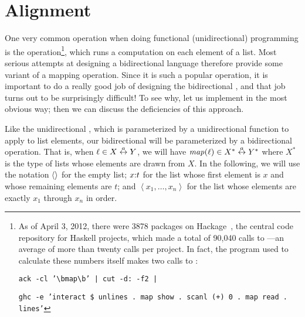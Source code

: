 \section{Alignment}
One very common operation when doing functional (unidirectional) programming
is the \map operation\footnote{As of April 3, 2012, there were 3878 packages
on Hackage~\cite{Hackage2012}, the central code repository for Haskell
projects, which made a total of 90,040 calls to \map---an average of more
than twenty calls per project. In fact, the program used to calculate these
numbers itself makes two calls to \map:

\noindent\texttt{ack -cl '\textbackslash bmap\textbackslash b' | cut -d: -f2 |}

\noindent\texttt{ghc -e 'interact \$ unlines . map show . scanl (+) 0 . map read . lines'}
}, which runs a computation on each element of a list. Most serious attempts
at designing a bidirectional language therefore provide some variant of a
mapping operation. Since it is such a popular operation, it is important to
do a really good job of designing the bidirectional \map, and that job turns
out to be surprisingly difficult! To see why, let us implement \map in the
most obvious way; then we can discuss the deficiencies of this approach.

Like the unidirectional \map, which is parameterized by a unidirectional
function to apply to list elements, our bidirectional \map will be
parameterized by a bidirectional operation. That is, when $\ell \in X \overset{a}{\leftrightarrow}
Y$, we will have $\mathit{map}(\ell) \in X^* \overset{a}{\leftrightarrow} Y^*$ where $X^*$ is the type of
lists whose elements are drawn from $X$. In the following, we will use the
notation $\left<\right>$ for the empty list; $x \mathord{:} t$ for the list whose first
element is $x$ and whose remaining elements are $t$; and
$\left<x_1,\ldots,x_n\right>$ for the list whose elements are exactly $x_1$
through $x_n$ in order.

